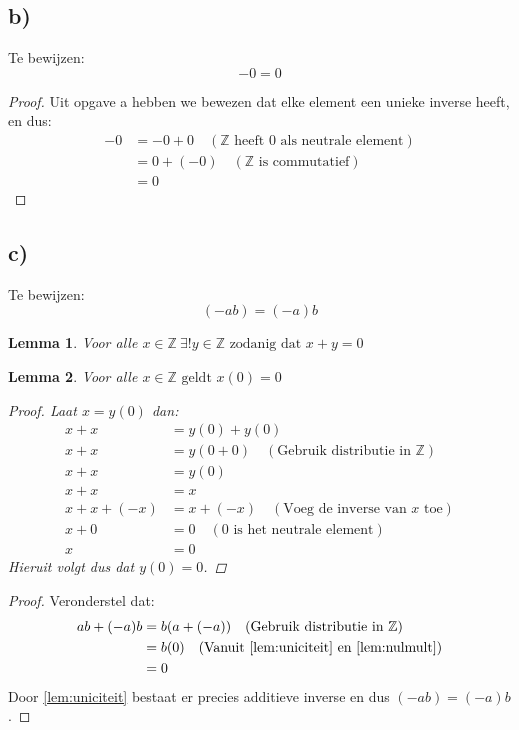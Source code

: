 \documentclass{article}
\newtheorem{lemma}{Lemma}
\newcommand{\Z}{\mathbb{Z}}
\newcommand{\tx}[1]{\text{#1}}
\newcommand{\zdd}{\text{ zodanig dat }}
\newcommand{\geldt}{\text{ geldt }}
\newcommand{\een}{\text{één }}
\begin{document}
\subsection*{b)}
Te bewijzen:
\[ -0 = 0 \]
\begin{proof}
    Uit opgave a hebben we bewezen dat elke element een unieke inverse heeft, en dus:
    \begin{align*}
        -0 & = -0 + 0  \quad (\Z \tx{ heeft $0$ als neutrale element}) \\
           & = 0 + (-0) \quad (\Z \tx{ is commutatief})                \\
           & = 0
    \end{align*}
\end{proof}

\subsection*{c)}
Te bewijzen:
\[(-ab) = (-a)b \]
\begin{lemma}\label{lem:uniciteit}
    Voor alle $x \in \Z \ \exists ! y \in \Z \zdd x + y = 0$
\end{lemma}
\begin{lemma}\label{lem:nulmult}
    Voor alle $x \in \Z \geldt x(0) = 0$
    \begin{proof}
        Laat $x = y(0)$ dan:
        \begin{align*}
            x + x        & = y(0) + y(0)                                       \\
            x + x        & = y(0 + 0) \quad (\tx{Gebruik distributie in }\Z)   \\
            x + x        & = y(0)                                              \\
            x + x        & = x                                                 \\
            x + x + (-x) & = x + (-x) \quad (\tx{Voeg de inverse van $x$ toe}) \\
            x + 0        & = 0 \quad (\tx{$0$ is het neutrale element})        \\
            x            & = 0
        \end{align*}
        Hieruit volgt dus dat $y(0) = 0$.
    \end{proof}
\end{lemma}
\begin{proof}
    Veronderstel dat:
    \begin{align*}
        ab + (-a)b & = b(a + (-a)) \quad (\tx{Gebruik distributie in }\Z)                        \\
                   & = b(0) \quad (\tx{Vanuit \autoref{lem:uniciteit} en \autoref{lem:nulmult}}) \\
                   & = 0
    \end{align*}
    Door \autoref{lem:uniciteit} bestaat er precies \een additieve inverse en dus
    $(-ab) = (-a)b$.
\end{proof}
\end{document}

